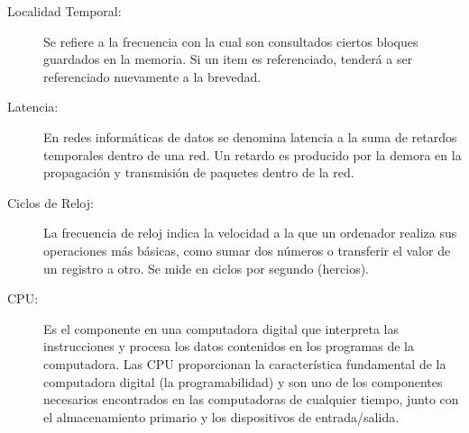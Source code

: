 \begin{description}
	\item[Localidad Temporal:]
Se refiere a la frecuencia con la cual son consultados ciertos bloques guardados en la memoria.
Si un item es referenciado, tenderá a ser referenciado nuevamente a la brevedad.

	\item[Latencia:]
En redes informáticas de datos se denomina latencia a la suma de retardos temporales dentro de una red.
Un retardo es producido por la demora en la propagación y transmisión de paquetes dentro de la red.

	\item[Ciclos de Reloj:]
La frecuencia de reloj indica la velocidad a la que un ordenador realiza sus operaciones más básicas,
como sumar dos números o transferir el valor de un registro a otro. Se mide en ciclos por segundo
(hercios).
	\item[CPU:]
Es el componente en una computadora digital que interpreta las instrucciones y procesa los datos
contenidos en los programas de la computadora. Las CPU proporcionan la característica fundamental de la
computadora digital (la programabilidad) y son uno de los componentes necesarios encontrados en las
computadoras de cualquier tiempo, junto con el almacenamiento primario y los dispositivos de
entrada/salida. 
\end{description}
